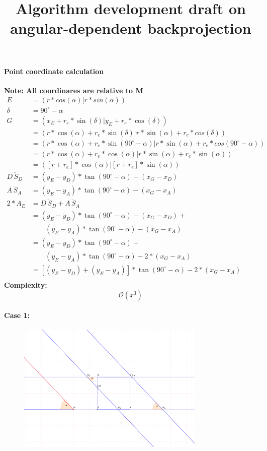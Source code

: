 \documentclass[a4paper,10pt,fleqn]{scrartcl}
\date{}
\title{Algorithm development draft on angular-dependent backprojection}
\begin{document}
\maketitle
\paragraph{Point coordinate calculation}
\textbf{Note: All coordinares are relative to M}
\begin{align*}
E &= (r * cos(\alpha) | r * sin(\alpha)) \\
\delta &= 90^\circ - \alpha \\
G &= (x_E + r_e * \sin(\delta) | y_E + r_e * \cos(\delta)) \\
  &= (r * \cos(\alpha) + r_e * \sin(\delta) | r * \sin(\alpha) + r_e * cos(\delta))\\
  &= (r * \cos(\alpha) + r_e * \sin(90^\circ - \alpha) | r * \sin(\alpha) + r_e * cos(90^\circ - \alpha))\\
  &= (r * \cos(\alpha) + r_e * \cos(\alpha) | r * \sin(\alpha) + r_e * \sin(\alpha))\\
  &= ([r + r_e] * \cos(\alpha) | [r + r_e] * \sin(\alpha))\\
\overline{D\,S_D} &= (y_E - y_D) * \tan(90^\circ-\alpha) - (x_G - x_D) \\
\overline{A\,S_A} &= (y_E - y_A) * \tan(90^\circ-\alpha) - (x_G - x_A) \\
2 * A_E &= \overline{D\,S_D} + \overline{A\,S_A} \\ %
  &= (y_E - y_D) * \tan(90^\circ-\alpha) - (x_G - x_D) +\\&\qquad(y_E - y_A) * \tan(90^\circ-\alpha) - (x_G - x_A)\\
  &= (y_E - y_D) * \tan(90^\circ-\alpha) +\\&\qquad(y_E - y_A) * \tan(90^\circ-\alpha) - 2 * (x_G - x_A) \\
  &= [(y_E - y_D) + (y_E - y_A)] * \tan(90^\circ-\alpha) - 2 * (x_G - x_A)\\
\end{align*}
\textbf{Complexity:}
\begin{equation}
\mathcal{O}(x^3)
\end{equation}
\newpage
\paragraph{Case 1:}
\begin{figure}[h]
\includegraphics[width=0.8\textwidth]{case1}
\end{figure}
\end{document}
